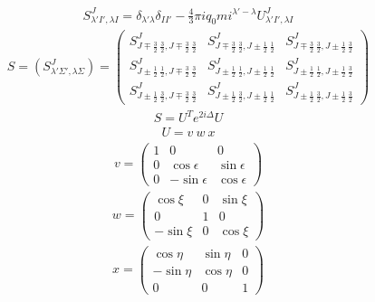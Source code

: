 \documentclass[11pt,aps]{revtex4}
\begin{document}
\begin{equation}
\begin{split}
S^J_{\lambda' I',\lambda I}=\delta_{\lambda'\lambda}\delta_{II'}-\frac 4 3 \pi iq_0 mi^{\lambda'-\lambda}U^J_{\lambda' I',\lambda I}
\end{split}
\end{equation}
\begin{equation}
\begin{split}
S=(S^J_{\lambda'\Sigma', \lambda\Sigma})
=\begin{pmatrix} 
S^J_{J\mp\frac3 2\ \frac3 2,J\mp\frac3 2\ \frac3 2} & S^J_{J\mp\frac3 2\ \frac3 2,J\pm\frac1 2\ \frac1 2} &  S^J_{J\mp\frac3 2\ \frac3 2,J\pm\frac1 2\ \frac3 2}\\ 
S^J_{J\pm\frac1 2\ \frac1 2,J\mp\frac3 2\ \frac3 2} & S^J_{J\pm\frac1 2\ \frac1 2,J\pm\frac1 2\ \frac1 2} &  S^J_{J\pm\frac1 2\ \frac1 2,J\pm\frac1 2\ \frac3 2}\\
S^J_{J\pm\frac1 2\ \frac3 2,J\mp\frac3 2\ \frac3 2} & S^J_{J\pm\frac1 2\ \frac3 2,J\pm\frac1 2\ \frac1 2} &  S^J_{J\pm\frac1 2\ \frac3 2,J\pm\frac1 2\ \frac3 2}
\end{pmatrix}
\end{split}
\end{equation}
\begin{equation}
\begin{split}
S=U^T e^{2i\Delta} U
\end{split}
\end{equation}
\begin{equation}
\begin{split}
U=v\ w\ x
\end{split}
\end{equation}
\begin{equation}
\begin{split}
v=
\begin{pmatrix}
1 & 0 & 0 \\
0 & \cos \epsilon & \sin \epsilon\\
0 & -\sin \epsilon & \cos \epsilon
\end{pmatrix}
\end{split}
\end{equation}
\begin{equation}
\begin{split}
w=
\begin{pmatrix}
\cos \xi & 0 & \sin \xi\\
0 & 1 & 0\\
-\sin \xi & 0 & \cos \xi
\end{pmatrix}
\end{split}
\end{equation}
\begin{equation}
\begin{split}
x=
\begin{pmatrix}
\cos \eta & \sin \eta & 0\\
-\sin \eta & \cos \eta & 0\\
0 & 0 & 1
\end{pmatrix}
\end{split}
\end{equation}
\end{document}
